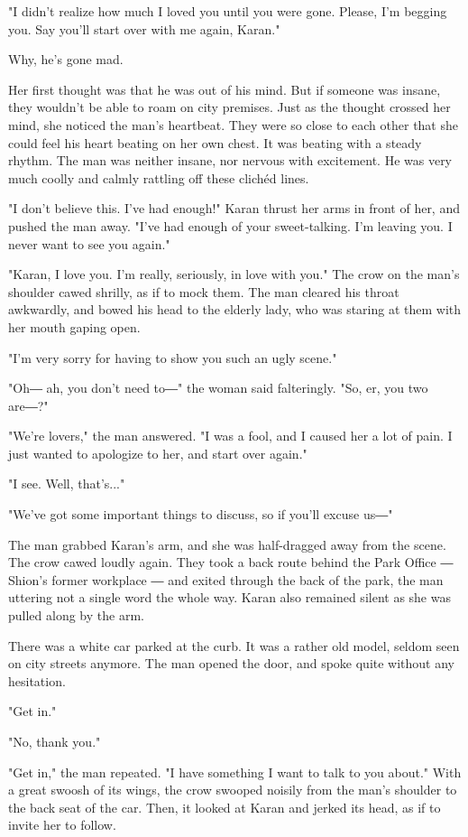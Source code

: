 "I didn't realize how much I loved you until you were gone. Please, I'm
begging you. Say you'll start over with me again, Karan."

Why, he's gone mad.

Her first thought was that he was out of his mind. But if someone was
insane, they wouldn't be able to roam on city premises. Just as the
thought crossed her mind, she noticed the man's heartbeat. They were so
close to each other that she could feel his heart beating on her own
chest. It was beating with a steady rhythm. The man was neither insane,
nor nervous with excitement. He was very much coolly and calmly rattling
off these clichéd lines.

"I don't believe this. I've had enough!" Karan thrust her arms in front
of her, and pushed the man away. "I've had enough of your sweet-talking.
I'm leaving you. I never want to see you again."

"Karan, I love you. I'm really, seriously, in love with you." The crow
on the man's shoulder cawed shrilly, as if to mock them. The man cleared
his throat awkwardly, and bowed his head to the elderly lady, who was
staring at them with her mouth gaping open.

"I'm very sorry for having to show you such an ugly scene."

"Oh― ah, you don't need to―" the woman said falteringly. "So, er, you
two are―?"

"We're lovers," the man answered. "I was a fool, and I caused her a lot
of pain. I just wanted to apologize to her, and start over again."

"I see. Well, that's..."

"We've got some important things to discuss, so if you'll excuse us―"

The man grabbed Karan's arm, and she was half-dragged away from the
scene. The crow cawed loudly again. They took a back route behind the
Park Office ― Shion's former workplace ― and exited through the back of
the park, the man uttering not a single word the whole way. Karan also
remained silent as she was pulled along by the arm.

There was a white car parked at the curb. It was a rather old model,
seldom seen on city streets anymore. The man opened the door, and spoke
quite without any hesitation.

"Get in."

"No, thank you."

"Get in," the man repeated. "I have something I want to talk to you
about." With a great swoosh of its wings, the crow swooped noisily from
the man's shoulder to the back seat of the car. Then, it looked at Karan
and jerked its head, as if to invite her to follow.

